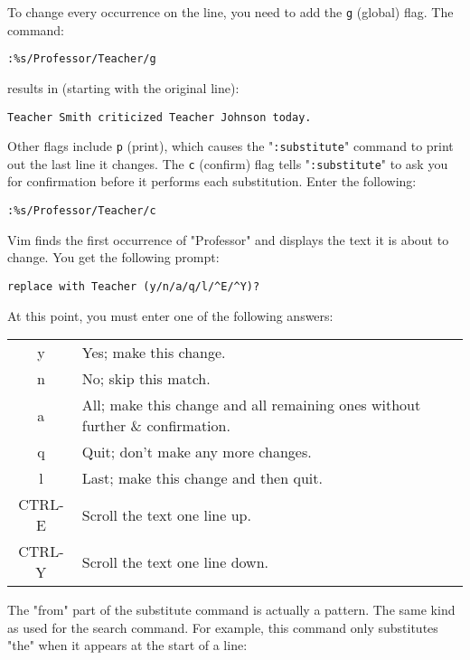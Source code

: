 To change every occurrence on the line, you need to add the \verb!g! (global) flag.
The command:

\begin{Verbatim}[samepage=true]
 :%s/Professor/Teacher/g
\end{Verbatim}

results in (starting with the original line):

\begin{Verbatim}[samepage=true]
    Teacher Smith criticized Teacher Johnson today. 
\end{Verbatim}

Other flags include \verb!p! (print), which causes the "\verb!:substitute!" command to print out the last line it changes.
The \verb!c! (confirm) flag tells "\verb!:substitute!" to ask you for confirmation before it performs each substitution.
Enter the following:

\begin{Verbatim}[samepage=true]
 :%s/Professor/Teacher/c
\end{Verbatim}

Vim finds the first occurrence of "Professor" and displays the text it is about to change.
You get the following prompt:

\begin{Verbatim}[samepage=true]
 replace with Teacher (y/n/a/q/l/^E/^Y)?
\end{Verbatim}

At this point, you must enter one of the following answers:

\begin{center}\begin{longtable}{c l}
				y & Yes; make this change. \\
				n & No; skip this match. \\
				a & All; make this change and all remaining ones without further \& confirmation. \\
				q & Quit; don't make any more changes. \\
				l & Last; make this change and then quit. \\
				CTRL-E & Scroll the text one line up. \\
				CTRL-Y & Scroll the text one line down. \\
\end{longtable}\end{center}

The "from" part of the substitute command is actually a pattern.
The same kind as used for the search command.
For example, this command only substitutes "the" when it appears at the start of a line:

